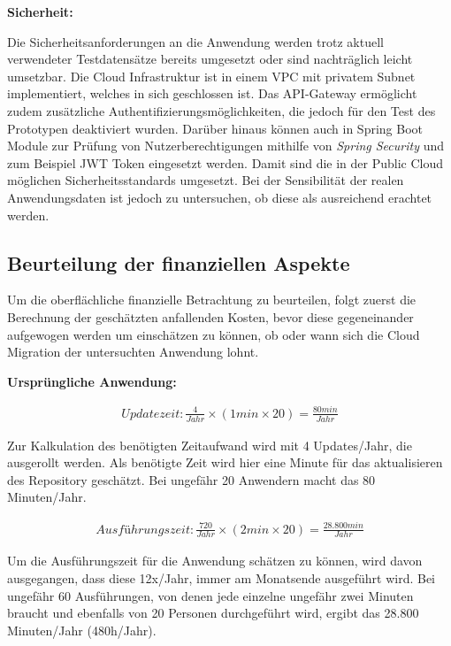 \textbf{Sicherheit:}

Die Sicherheitsanforderungen an die Anwendung werden trotz aktuell verwendeter Testdatensätze bereits umgesetzt oder sind nachträglich leicht umsetzbar. Die Cloud Infrastruktur ist in einem \ac{VPC} mit privatem Subnet implementiert, welches in sich geschlossen ist. Das API-Gateway ermöglicht zudem zusätzliche Authentifizierungsmöglichkeiten, die jedoch für den Test des Prototypen deaktiviert wurden. Darüber hinaus können auch in \gls{Spring Boot} Module zur Prüfung von Nutzerberechtigungen mithilfe von \textit{Spring Security} und zum Beispiel JWT Token eingesetzt werden. Damit sind die in der Public Cloud möglichen Sicherheitsstandards umgesetzt. Bei der Sensibilität der realen Anwendungsdaten ist jedoch zu untersuchen, ob diese als ausreichend erachtet werden.

\subsection{Beurteilung der finanziellen Aspekte}
Um die oberflächliche finanzielle Betrachtung zu beurteilen, folgt zuerst die Berechnung der geschätzten anfallenden Kosten, bevor diese gegeneinander aufgewogen werden um einschätzen zu können, ob oder wann sich die Cloud Migration der untersuchten Anwendung lohnt.

\textbf{Ursprüngliche Anwendung:}


\begin{align}
    Updatezeit: \frac{4}{Jahr} \times \left(1min \times 20\right) = \frac{80min}{Jahr}
\end{align}

Zur Kalkulation des benötigten Zeitaufwand wird mit 4 Updates/Jahr, die ausgerollt werden. Als benötigte Zeit wird hier eine Minute für das aktualisieren des \gls{Repository} geschätzt. Bei ungefähr 20 Anwendern macht das 80 Minuten/Jahr.

\begin{align}
    Ausführungszeit: \frac{720}{Jahr} \times \left(2min \times 20\right)  = \frac{28.800min}{Jahr}
\end{align}

Um die Ausführungszeit für die Anwendung schätzen zu können, wird davon ausgegangen, dass diese 12x/Jahr, immer am Monatsende ausgeführt wird. Bei ungefähr 60 Ausführungen, von denen jede einzelne ungefähr zwei Minuten braucht und ebenfalls von 20 Personen durchgeführt wird, ergibt das 28.800 Minuten/Jahr (480h/Jahr).

